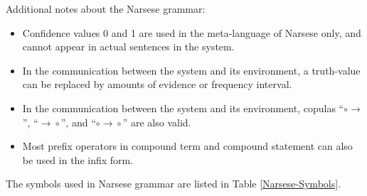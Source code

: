Additional notes about the Narsese grammar:
\begin{itemize}
	\item 
Confidence values 0 and 1 are used in the meta-language of Narsese only, and cannot appear in actual sentences in the system.
  \item
In the communication between the system and its environment, a truth-value can be replaced by amounts of evidence or frequency interval.
  \item
In the communication between the system and its environment, copulas ``$\circ\!\!\rightarrow$'', ``$\rightarrow\!\!\circ$'', and ``$\circ\!\!\rightarrow\!\!\circ$'' are also valid.
	\item 
Most prefix operators in compound term and compound statement can also be used in the infix form.
\end{itemize}

The symbols used in Narsese grammar are listed in Table \ref{Narsese-Symbols}.

